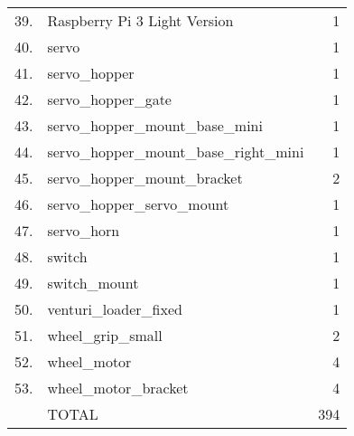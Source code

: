 \begin{longtable}{clr}
	39.       & Raspberry Pi 3 Light Version            & 1                        \\ 
	40.       & servo                                   & 1                        \\ 
	41.       & servo\_hopper                           & 1                        \\ 
	42.       & servo\_hopper\_gate                     & 1                        \\ 
	43.       & servo\_hopper\_mount\_base\_mini        & 1                        \\ 
	44.       & servo\_hopper\_mount\_base\_right\_mini & 1                        \\ 
	45.       & servo\_hopper\_mount\_bracket           & 2                        \\ 
	46.       & servo\_hopper\_servo\_mount             & 1                        \\ 
	47.       & servo\_horn                             & 1                        \\ 
	48.       & switch                                  & 1                        \\ 
	49.       & switch\_mount                           & 1                        \\ 
	50.       & venturi\_loader\_fixed                  & 1                        \\ 
	51.       & wheel\_grip\_small                      & 2                        \\ 
	52.       & wheel\_motor                            & 4                        \\ 
	53.       & wheel\_motor\_bracket                   & 4                        \\ 
			 & TOTAL                                   & 394                      \\ 
	\bottomrule
\end{longtable}